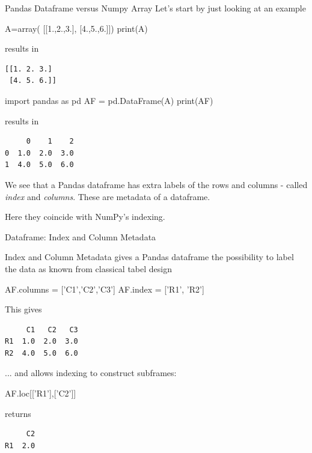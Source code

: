 \documentclass[hyperref={pdfpagelabels=false},table]{beamer}
\begin{document}
\begin{frame}[fragile]{Pandas Dataframe versus Numpy Array}
\vfill
Let's start by just looking at an example
\vfill
\begin{minipage}{0.45\textwidth}
\begin{python}
A=array(
     [[1.,2.,3.],
      [4.,5.,6.]])
print(A)
\end{python}
results in
\begin{verbatim}
[[1. 2. 3.]
 [4. 5. 6.]]
\end{verbatim}
\end{minipage}
\begin{minipage}{0.45\textwidth}
\begin{python}
import pandas as pd
AF = pd.DataFrame(A)
print(AF)
\end{python}
results in
\begin{verbatim}
     0    1    2
0  1.0  2.0  3.0
1  4.0  5.0  6.0
\end{verbatim}
\end{minipage}
\vfill
We see that a Pandas dataframe has extra labels of the rows and columns - called
\emph{index} and \emph{columns}. These are metadata of a dataframe.

Here they coincide with NumPy's indexing.

\end{frame}
\begin{frame}[fragile]{Dataframe: Index and Column Metadata}

Index and Column Metadata gives a Pandas dataframe the possibility to label
the data as known from classical tabel design

\begin{python}
AF.columns = ['C1','C2','C3']
AF.index    = ['R1', 'R2']
\end{python}
\vfill
This gives
\begin{verbatim}
     C1   C2   C3
R1  1.0  2.0  3.0
R2  4.0  5.0  6.0
\end{verbatim}
\vfill
... and allows  indexing to construct subframes:
\vfill
\begin{minipage}{0.45\textwidth}
\begin{python}
AF.loc[['R1'],['C2']]
\end{python}
\end{minipage} \hfill
returns \hfill
\begin{minipage}{0.25\textwidth}
\begin{verbatim}
     C2
R1  2.0
\end{verbatim}
\end{minipage}
\end{frame}
\end{document}
